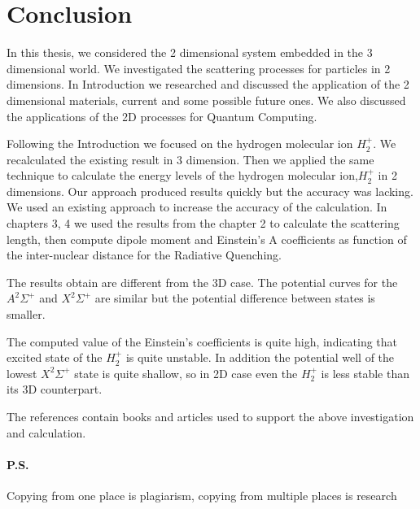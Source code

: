 \chapter{Conclusion}
\label{conclusion}

In this thesis, we considered the 2 dimensional system embedded in the 3 dimensional world. We investigated the scattering processes for particles in 2 dimensions. In Introduction we researched and discussed the application of the 2 dimensional materials, current and some possible future ones. We also discussed the applications of the 2D processes for Quantum Computing.

Following the Introduction we focused on the hydrogen molecular ion $ H_2^{+} $. We recalculated the existing result in 3 dimension. 
Then we applied the same technique to calculate the energy levels of the hydrogen molecular ion,$ H_2^{+} $ in 2 dimensions. Our approach produced results quickly but the accuracy was lacking. We used an existing approach to increase the accuracy of the calculation. In chapters 3, 4 we used the results from the chapter 2 to calculate the scattering length, then compute dipole moment and Einstein's A coefficients as function of the inter-nuclear distance for the Radiative Quenching.

The results obtain are different from the 3D case. The potential curves for the $ A^2\Sigma^+ $ and $X^2\Sigma^+ $ are similar but the potential difference between states is smaller. 

The computed value of the Einstein's coefficients is quite high, indicating that excited state of the $ H_2^{+} $ is quite unstable. In addition the potential well of the lowest $ X^2\Sigma^+ $ state is quite shallow, so in 2D case even the  $ H_2^{+} $ is less stable than its 3D counterpart.  

The references contain books and articles used to support the above investigation and calculation.

\subsubsection{P.S.}
Copying from one place is plagiarism, copying from multiple places is research


